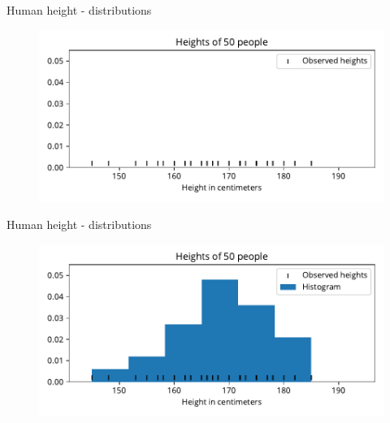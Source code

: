 \documentclass[12pt, aspectratio=149]{beamer}
\theoremstyle{plain}
\begin{document}
\begin{frame}[fragile]{Human height - distributions}
    \begin{center}
     \begin{figure}
     	\centering
     	\includegraphics[width=0.99\linewidth]{figures/heights_1}
     \end{figure}
     \end{center}
\end{frame}

\begin{frame}[fragile]{Human height - distributions}
    \begin{center}
     \begin{figure}
     	\centering
     	\includegraphics[width=0.99\linewidth]{figures/heights_2}
     \end{figure}
     \end{center}
\end{frame}
\end{document}
